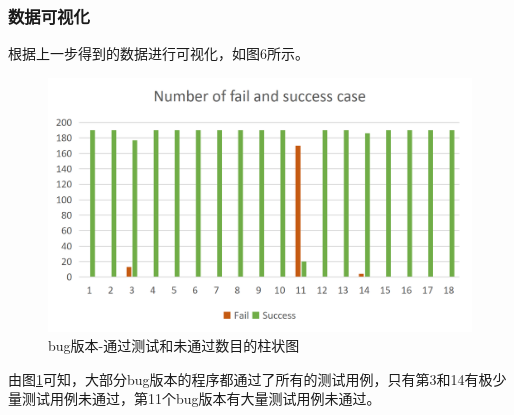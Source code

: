 \documentclass[12pt, a4paper, oneside,bibend=bibtex]{ctexart}
\begin{document}
\subsubsection{数据可视化}
根据上一步得到的数据进行可视化，如图6所示。

\begin{figure}[htbp]
    \centering
    \includegraphics[width=14cm]{images/diff.png}
    \caption{bug版本-通过测试和未通过数目的柱状图}
    \label{allbug}
\end{figure}


由图\ref{allbug}可知，大部分bug版本的程序都通过了所有的测试用例，只有第3和14有极少量测试用例未通过，第11个bug版本有大量测试用例未通过。
\end{document}

